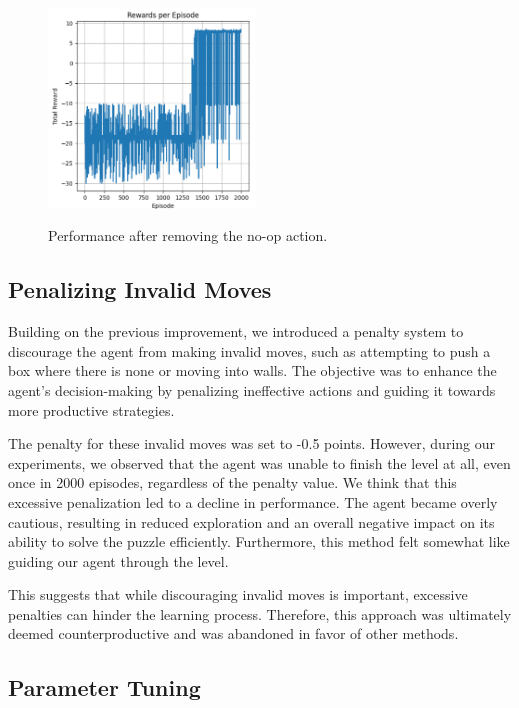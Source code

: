 \documentclass[10pt,twocolumn]{article}
\begin{document}
\begin{figure}[ht]
    \centering
    \includegraphics[width=0.49\textwidth,height=6cm]{Images/performance_no_op.png}
    \caption{Performance after removing the no-op action.}
    \label{fig:performance_no_op}
\end{figure}

\subsection{Penalizing Invalid Moves}

Building on the previous improvement, we introduced a penalty system to discourage the agent from making invalid moves, such as attempting to push a box where there is none or moving into walls. The objective was to enhance the agent's decision-making by penalizing ineffective actions and guiding it towards more productive strategies.

The penalty for these invalid moves was set to -0.5 points. However, during our experiments, we observed that the agent was unable to finish the level at all, even once in 2000 episodes, regardless of the penalty value. We think that this excessive penalization led to a decline in performance. The agent became overly cautious, resulting in reduced exploration and an overall negative impact on its ability to solve the puzzle efficiently. Furthermore, this method felt somewhat like guiding our agent through the level.

This suggests that while discouraging invalid moves is important, excessive penalties can hinder the learning process. Therefore, this approach was ultimately deemed counterproductive and was abandoned in favor of other methods.

\subsection{Parameter Tuning}
\end{document}
